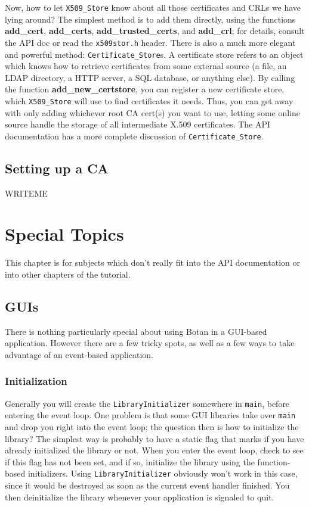 \documentclass{article}
\newcommand{\filename}[1]{\texttt{#1}}
\newcommand{\function}[1]{\textbf{#1}}
\newcommand{\type}[1]{\texttt{#1}}
\begin{document}
Now, how to let \type{X509\_Store} know about all those certificates and CRLs
we have lying around? The simplest method is to add them directly, using the
functions \function{add\_cert}, \function{add\_certs},
\function{add\_trusted\_certs}, and \function{add\_crl}; for details, consult
the API doc or read the \filename{x509stor.h} header. There is also a much more
elegant and powerful method: \type{Certificate\_Store}s. A certificate store
refers to an object which knows how to retrieve certificates from some external
source (a file, an LDAP directory, a HTTP server, a SQL database, or anything
else). By calling the function \function{add\_new\_certstore}, you can register
a new certificate store, which \type{X509\_Store} will use to find certificates
it needs. Thus, you can get away with only adding whichever root CA cert(s) you
want to use, letting some online source handle the storage of all intermediate
X.509 certificates. The API documentation has a more complete discussion of
\type{Certificate\_Store}.

\subsection{Setting up a CA}

WRITEME

\pagebreak

\section{Special Topics}

This chapter is for subjects which don't really fit into the API documentation
or into other chapters of the tutorial.

\subsection{GUIs}

There is nothing particularly special about using Botan in a GUI-based
application. However there are a few tricky spots, as well as a few ways to
take advantage of an event-based application.

\subsubsection{Initialization}

Generally you will create the \type{LibraryInitializer} somewhere in
\texttt{main}, before entering the event loop. One problem is that some GUI
libraries take over \texttt{main} and drop you right into the event loop; the
question then is how to initialize the library? The simplest way is probably to
have a static flag that marks if you have already initialized the library or
not. When you enter the event loop, check to see if this flag has not been set,
and if so, initialize the library using the function-based initializers. Using
\type{LibraryInitializer} obviously won't work in this case, since it would be
destroyed as soon as the current event handler finished. You then deinitialize
the library whenever your application is signaled to quit.
\end{document}
